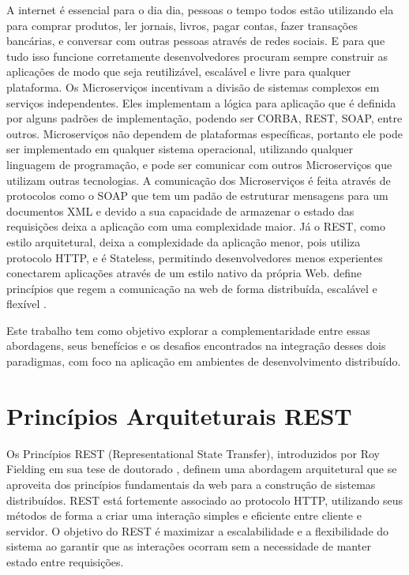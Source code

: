 \documentclass[12pt]{article}
\begin{document}
	A internet é essencial para o dia dia, pessoas o tempo todos estão utilizando ela para comprar produtos, ler jornais, livros, pagar contas, fazer transações bancárias, e conversar com outras pessoas através de redes sociais. E para que tudo isso funcione corretamente desenvolvedores procuram sempre construir as aplicações de modo que seja reutilizável, escalável e livre para qualquer plataforma. Os Microserviços incentivam a divisão de sistemas complexos em serviços independentes. Eles implementam a lógica para aplicação que é definida por alguns padrões de implementação, podendo ser CORBA, REST, SOAP, entre outros. Microserviços não dependem de plataformas específicas, portanto ele pode ser implementado em qualquer sistema operacional, utilizando qualquer linguagem de programação, e pode ser comunicar com outros Microserviços que utilizam outras tecnologias. A comunicação dos Microserviços é feita através de protocolos como o SOAP que tem um padão de estruturar mensagens para um documentos XML e devido a sua capacidade de armazenar o estado das requisições deixa a aplicação com uma complexidade maior. Já o REST, como estilo arquitetural, deixa a complexidade da aplicação menor, pois utiliza protocolo HTTP, e é Stateless, permitindo desenvolvedores menos experientes conectarem aplicações através de um estilo nativo da própria Web. define princípios que regem a comunicação na web de forma distribuída, escalável e flexível \cite{cavaleiro2013}.
	
	Este trabalho tem como objetivo explorar a complementaridade entre essas abordagens, seus benefícios e os desafios encontrados na integração desses dois paradigmas, com foco na aplicação em ambientes de desenvolvimento distribuído.
	
\section{Princípios Arquiteturais REST}

Os Princípios REST (Representational State Transfer), introduzidos por Roy Fielding em sua tese de doutorado \cite{fielding2000}, definem uma abordagem arquitetural que se aproveita dos princípios fundamentais da web para a construção de sistemas distribuídos. REST está fortemente associado ao protocolo HTTP, utilizando seus métodos de forma a criar uma interação simples e eficiente entre cliente e servidor. O objetivo do REST é maximizar a escalabilidade e a flexibilidade do sistema ao garantir que as interações ocorram sem a necessidade de manter estado entre requisições.
\end{document}

